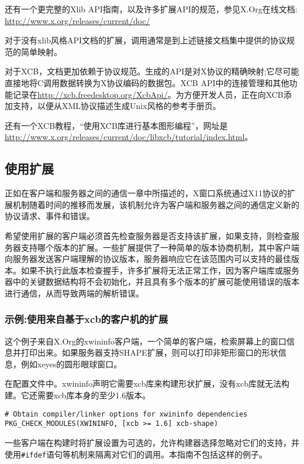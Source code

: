 还有一个更完整的Xlib API指南，以及许多扩展API的规范，参见X.Org在线文档: \url{http://www.x.org/releases/current/doc/}

对于没有xlib风格API文档的扩展，调用通常是到上述链接文档集中提供的协议规范的简单映射。

对于XCB，文档更加依赖于协议规范。生成的API是对X协议的精确映射;它尽可能直接地将C调用数据转换为X协议编码的数据包。XCB API中的连接管理和其他功能记录在\url{http://xcb.freedesktop.org/XcbApi/}。为方便开发人员，正在向XCB添加支持，以便从XML协议描述生成Unix风格的参考手册页。

还有一个XCB教程，“使用XCB库进行基本图形编程”，网址是\url{http://www.x.org/releases/current/doc/libxcb/tutorial/index.html}。

\subsection{使用扩展}

正如在客户端和服务器之间的通信一章中所描述的，X窗口系统通过X11协议的扩展机制随着时间的推移而发展，该机制允许为客户端和服务器之间的通信定义新的协议请求、事件和错误。

希望使用扩展的客户端必须首先检查服务器是否支持该扩展，如果支持，则检查服务器支持哪个版本的扩展。一些扩展提供了一种简单的版本协商机制，其中客户端向服务器发送客户端理解的协议版本，服务器响应它在该范围内可以支持的最佳版本。如果不执行此版本检查握手，许多扩展将无法正常工作，因为客户端库或服务器中的关键数据结构将不会初始化，并且具有多个版本的扩展可能使用错误的版本进行通信，从而导致两端的解析错误。

\subsubsection{示例:使用来自基于xcb的客户机的扩展}

这个例子来自X.Org的xwininfo客户端，一个简单的客户端，检索屏幕上的窗口信息并打印出来。如果服务器支持SHAPE扩展，则可以打印非矩形窗口的形状信息，例如xeyes的圆形眼球窗口。

\noindent 在配置文件中。xwininfo声明它需要xcb库来构建形状扩展，没有xcb库就无法构建。它还需要xcb库本身的至少1.6版本。

\begin{lstlisting}
# Obtain compiler/linker options for xwininfo dependencies
PKG_CHECK_MODULES(XWININFO, [xcb >= 1.6] xcb-shape)
\end{lstlisting}
\vspace{-4em}
\noindent 一些客户端在构建时将扩展设置为可选的，允许构建器选择忽略对它们的支持，并使用\lstinline|#ifdef|语句等机制来隔离对它们的调用。本指南不包括这样的例子。

